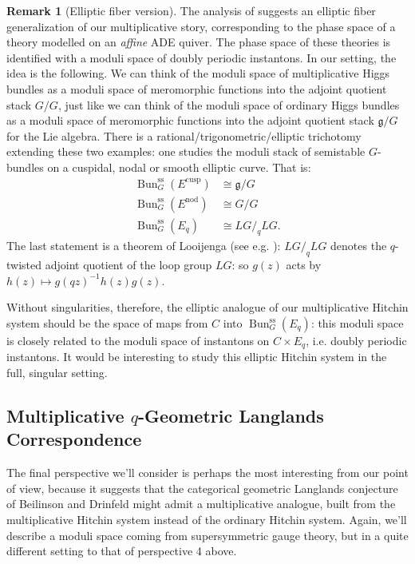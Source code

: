 \documentclass[11pt, oneside, reqno]{amsart}
\theoremstyle{definition} \newtheorem{definition}{Definition}[section]
\theoremstyle{definition} \newtheorem{remark}[definition]{Remark}
\theoremstyle{definition} \newtheorem{remarks}[definition]{Remarks}
\theoremstyle{definition} \newtheorem{question}[definition]{Question}
\theoremstyle{definition} \newtheorem*{note}{Note}
\theoremstyle{definition} \newtheorem{example}[definition]{Example}
\theoremstyle{definition} \newtheorem{examples}[definition]{Examples}
\renewcommand{\gg}{\mathfrak{g}}
\newcommand{\mr}[1]{\mathrm{#1}}
\newcommand{\iso}{\cong}
\DeclareMathOperator{\bun}{Bun}
\begin{document}
\begin{remark}[Elliptic fiber version]
  The analysis of \cite{NekrasovPestun} suggests an elliptic fiber
  generalization of our multiplicative story, corresponding to the
  phase space of a theory modelled on an \emph{affine} ADE quiver.
  The phase space of these theories is identified with a moduli space
  of doubly periodic instantons.  In our setting, the idea is the
  following.  We can think of the moduli space of multiplicative Higgs
  bundles as a moduli space of meromorphic functions into the adjoint
  quotient stack $G/G$, just like we can think of the moduli space of
  ordinary Higgs bundles as a moduli space of meromorphic functions
  into the adjoint quotient stack $\gg/G$ for the Lie algebra.  There
  is a rational/trigonometric/elliptic trichotomy extending these two
  examples: one studies the moduli stack of semistable $G$-bundles on
  a cuspidal, nodal or smooth elliptic curve.  That is:
\begin{align*}
\bun^{\mr{ss}}_G(E^{\mr{cusp}}) &\iso \gg/G \\
\bun^{\mr{ss}}_G(E^{\mr{nod}}) &\iso G/G \\
\bun^{\mr{ss}}_G(E_q) &\iso LG/_q LG.
\end{align*}
The last statement is a theorem of Looijenga (see e.g. \cite{Laszlo}): $LG/_q LG$ denotes the $q$-twisted adjoint quotient of the loop group $LG$: so $g(z)$ acts by $h(z) \mapsto g(qz)^{-1}h(z)g(z)$.  

Without singularities, therefore, the elliptic analogue of our
multiplicative Hitchin system should be the space of maps from $C$
into $\bun^{\mr{ss}}_G(E_q)$: this moduli space is closely related to
the moduli space of instantons on $C \times E_q$, i.e. doubly periodic
instantons.  It would be interesting to study this elliptic Hitchin
system in the full, singular setting.
\end{remark}

\subsection{Multiplicative $q$-Geometric Langlands Correspondence}
The final perspective we'll consider is perhaps the most interesting from our point of view, because it suggests that the categorical geometric Langlands conjecture of Beilinson and Drinfeld might admit a multiplicative analogue, built from the multiplicative Hitchin system instead of the ordinary Hitchin system.  Again, we'll describe a moduli space coming from supersymmetric gauge theory, but in a quite different setting to that of perspective 4 above.
\end{document}
